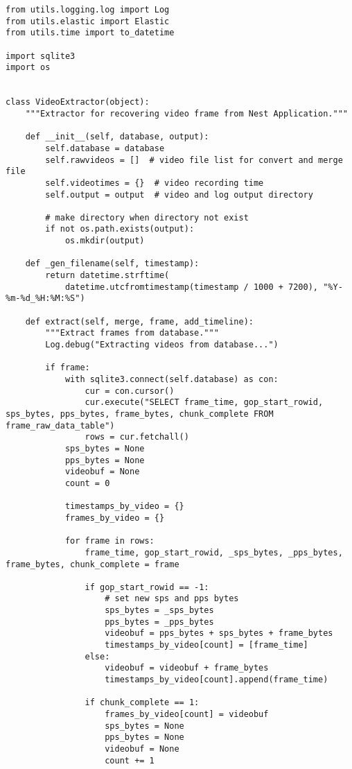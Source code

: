 \documentclass{easychair}
\begin{document}
\begin{enumerate}
\begin{lstlisting}
from utils.logging.log import Log
from utils.elastic import Elastic
from utils.time import to_datetime

import sqlite3
import os


class VideoExtractor(object):
    """Extractor for recovering video frame from Nest Application."""

    def __init__(self, database, output):
        self.database = database
        self.rawvideos = []  # video file list for convert and merge file
        self.videotimes = {}  # video recording time
        self.output = output  # video and log output directory

        # make directory when directory not exist
        if not os.path.exists(output):
            os.mkdir(output)

    def _gen_filename(self, timestamp):
        return datetime.strftime(
            datetime.utcfromtimestamp(timestamp / 1000 + 7200), "%Y-%m-%d_%H:%M:%S")

    def extract(self, merge, frame, add_timeline):
        """Extract frames from database."""
        Log.debug("Extracting videos from database...")

        if frame:
            with sqlite3.connect(self.database) as con:
                cur = con.cursor()
                cur.execute("SELECT frame_time, gop_start_rowid, sps_bytes, pps_bytes, frame_bytes, chunk_complete FROM frame_raw_data_table")
                rows = cur.fetchall()
            sps_bytes = None
            pps_bytes = None
            videobuf = None
            count = 0

            timestamps_by_video = {}
            frames_by_video = {}

            for frame in rows:
                frame_time, gop_start_rowid, _sps_bytes, _pps_bytes, frame_bytes, chunk_complete = frame

                if gop_start_rowid == -1:
                    # set new sps and pps bytes
                    sps_bytes = _sps_bytes
                    pps_bytes = _pps_bytes
                    videobuf = pps_bytes + sps_bytes + frame_bytes
                    timestamps_by_video[count] = [frame_time]
                else:
                    videobuf = videobuf + frame_bytes
                    timestamps_by_video[count].append(frame_time)

                if chunk_complete == 1:
                    frames_by_video[count] = videobuf
                    sps_bytes = None
                    pps_bytes = None
                    videobuf = None
                    count += 1


\end{lstlisting}
\end{enumerate}
\end{document}
